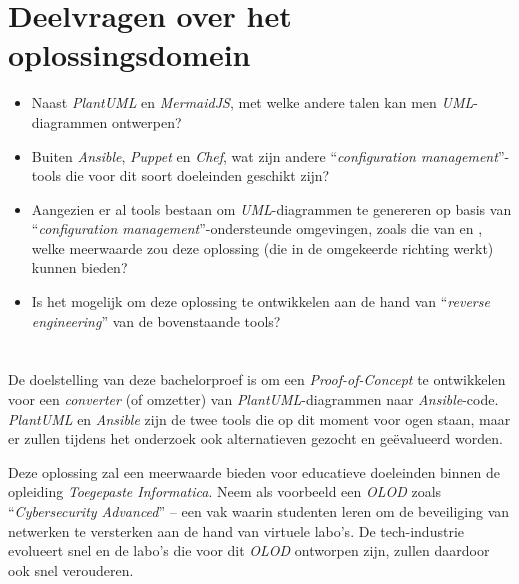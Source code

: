 \section{Deelvragen over het oplossingsdomein}%
\label{sec:inl_deelvragen_oplossingsdomein}

\begin{itemize}
  \item Naast \emph{PlantUML} en \emph{MermaidJS}, met welke andere talen kan men \emph{UML}-diagrammen ontwerpen?
  \item Buiten \emph{Ansible}, \emph{Puppet} en \emph{Chef}, wat zijn andere ``\emph{configuration management}''-tools die voor dit soort doeleinden geschikt zijn?
  \item Aangezien er al tools bestaan om \emph{UML}-diagrammen te genereren op basis van ``\emph{configuration management}''-ondersteunde omgevingen, zoals die van \textcite{teramako2023} en \textcite{rwxd2025}, welke meerwaarde zou deze oplossing (die in de omgekeerde richting werkt) kunnen bieden?
  \item Is het mogelijk om deze oplossing te ontwikkelen aan de hand van ``\emph{reverse engineering}'' van de bovenstaande tools?
\end{itemize}

\section{}%
\label{sec:inl_onderzoeksdoelstelling}


De doelstelling van deze bachelorproef is om een \emph{Proof-of-Concept} te ontwikkelen voor een \emph{converter} (of omzetter) van \emph{PlantUML}-diagrammen naar \emph{Ansible}-code. \emph{PlantUML} en \emph{Ansible} zijn de twee tools die op dit moment voor ogen staan, maar er zullen tijdens het onderzoek ook alternatieven gezocht en geëvalueerd worden.

Deze oplossing zal een meerwaarde bieden voor educatieve doeleinden binnen de opleiding \emph{Toegepaste Informatica}. Neem als voorbeeld een \emph{OLOD} zoals ``\emph{Cybersecurity Advanced}'' -- een vak waarin studenten leren om de beveiliging van netwerken te versterken aan de hand van virtuele labo's. De tech-industrie evolueert snel en de labo's die voor dit \emph{OLOD} ontworpen zijn, zullen daardoor ook snel verouderen.

